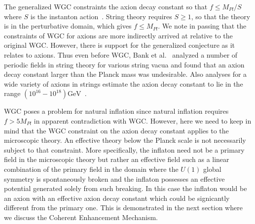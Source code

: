 \documentclass[12pt]{article}
\begin{document}
The generalized WGC constraints the axion decay constant so that $f \leq M_{Pl} / S$ where $S$ is the instanton action~\cite{Brown:2015iha, Brown:2015lia, Heidenreich:2015wga}.
String theory requires $S \geq 1$, so that the theory is in the perturbative domain, which gives $f \leq M_{Pl}$.
We note in passing that the constraints of WGC for axions are more indirectly arrived at relative to the original WGC.
However, there is support for the generalized conjecture as it relates to axions.
Thus even before WGC, Bank et al.~\cite{Banks:2003sx} analyzed a number of periodic fields in string theory for various string vacua and found that an axion decay constant larger than the Planck mass was undesirable.
Also analyses for a wide variety of axions in strings estimate the axion decay constant to lie in the range $\left(10^{16} - 10^{18}\right) \text{GeV}$~\cite{Svrcek:2006yi}.

WGC poses a problem for natural inflation since natural inflation requires $f > 5 M_{Pl}$ in apparent contradiction with WGC.
However, here we need to keep in mind that the WGC constraint on the axion decay constant applies to the microscopic theory.
An effective theory below the Planck scale is not necessarily subject to that constraint.
More specifically, the inflaton need not be a primary field in the microscopic theory but rather an effective field such as a linear combination of the primary field in the domain where the $U\left(1\right)$ global symmetry is spontaneously broken and the inflaton possesses an effective potential generated solely from such breaking.
In this case the inflaton would be an axion with an effective axion decay constant which could be signicantly different from the primary one.
This is demonstrated in the next section where we discuss the Coherent Enhancement Mechanism.
\end{document}
